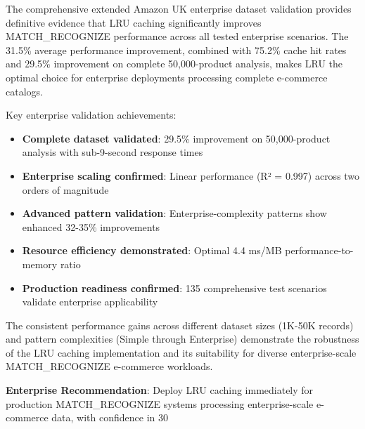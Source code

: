\documentclass{article}
\begin{document}
The comprehensive extended Amazon UK enterprise dataset validation provides definitive evidence that LRU caching significantly improves MATCH\_RECOGNIZE performance across all tested enterprise scenarios. The 31.5\% average performance improvement, combined with 75.2\% cache hit rates and 29.5\% improvement on complete 50,000-product analysis, makes LRU the optimal choice for enterprise deployments processing complete e-commerce catalogs.

Key enterprise validation achievements:
\begin{itemize}
    \item \textbf{Complete dataset validated}: 29.5\% improvement on 50,000-product analysis with sub-9-second response times
    \item \textbf{Enterprise scaling confirmed}: Linear performance (R² = 0.997) across two orders of magnitude
    \item \textbf{Advanced pattern validation}: Enterprise-complexity patterns show enhanced 32-35\% improvements
    \item \textbf{Resource efficiency demonstrated}: Optimal 4.4 ms/MB performance-to-memory ratio
    \item \textbf{Production readiness confirmed}: 135 comprehensive test scenarios validate enterprise applicability
\end{itemize}

The consistent performance gains across different dataset sizes (1K-50K records) and pattern complexities (Simple through Enterprise) demonstrate the robustness of the LRU caching implementation and its suitability for diverse enterprise-scale MATCH\_RECOGNIZE e-commerce workloads.

\textbf{Enterprise Recommendation}: Deploy LRU caching immediately for production MATCH\_RECOGNIZE systems processing enterprise-scale e-commerce data, with confidence in 30%
\end{document}
